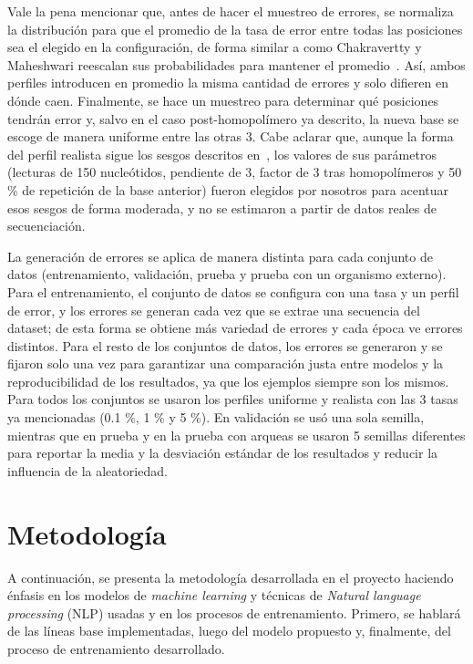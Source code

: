 \documentclass[sigconf,nonacm]{acmart}
\begin{document}
Vale la pena mencionar que, antes de hacer el muestreo de errores, se normaliza la distribución para que el promedio de la tasa de error entre todas las posiciones sea el elegido en la configuración, de forma similar a como Chakravertty y Maheshwari reescalan sus probabilidades para mantener el promedio~\cite{chakravertty2026vestige}. Así, ambos perfiles introducen en promedio la misma cantidad de errores y solo difieren en dónde caen. Finalmente, se hace un muestreo para determinar qué posiciones tendrán error y, salvo en el caso post-homopolímero ya descrito, la nueva base se escoge de manera uniforme entre las otras 3. Cabe aclarar que, aunque la forma del perfil realista sigue los sesgos descritos en~\cite{stoler2021sequencing}, los valores de sus parámetros (lecturas de 150 nucleótidos, pendiente de 3, factor de 3 tras homopolímeros y 50 \% de repetición de la base anterior) fueron elegidos por nosotros para acentuar esos sesgos de forma moderada, y no se estimaron a partir de datos reales de secuenciación.

La generación de errores se aplica de manera distinta para cada conjunto de datos (entrenamiento, validación, prueba y prueba con un organismo externo). Para el entrenamiento, el conjunto de datos se configura con una tasa y un perfil de error, y los errores se generan cada vez que se extrae una secuencia del dataset; de esta forma se obtiene más variedad de errores y cada época ve errores distintos. Para el resto de los conjuntos de datos, los errores se generaron y se fijaron solo una vez para garantizar una comparación justa entre modelos y la reproducibilidad de los resultados, ya que los ejemplos siempre son los mismos. Para todos los conjuntos se usaron los perfiles uniforme y realista con las 3 tasas ya mencionadas (0.1 \%, 1 \% y 5 \%). En validación se usó una sola semilla, mientras que en prueba y en la prueba con arqueas se usaron 5 semillas diferentes para reportar la media y la desviación estándar de los resultados y reducir la influencia de la aleatoriedad.

\section{Metodología}\label{sec:metodologia}

A continuación, se presenta la metodología desarrollada en el proyecto haciendo énfasis en los modelos de \emph{machine learning} y técnicas de \emph{Natural language processing} (NLP) usadas y en los procesos de entrenamiento. Primero, se hablará de las líneas base implementadas, luego del modelo propuesto y, finalmente, del proceso de entrenamiento desarrollado.
\end{document}
